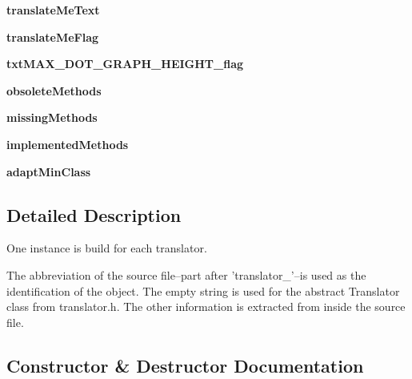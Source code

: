 \begin{DoxyCompactItemize}
{\bfseries translate\+Me\+Text}
\item 
\mbox{\label{classtranslator_1_1_transl_a35ef06fb423fad142c3b1cabbff55380}} 
{\bfseries translate\+Me\+Flag}
\item 
\mbox{\label{classtranslator_1_1_transl_a896359e684a202535f3e97911140eac6}} 
{\bfseries txt\+M\+A\+X\+\_\+\+D\+O\+T\+\_\+\+G\+R\+A\+P\+H\+\_\+\+H\+E\+I\+G\+H\+T\+\_\+flag}
\item 
\mbox{\label{classtranslator_1_1_transl_a106f9e989b0ac4620917606ebfab9471}} 
{\bfseries obsolete\+Methods}
\item 
\mbox{\label{classtranslator_1_1_transl_a4372f5945c9f587fc4476309b9323f31}} 
{\bfseries missing\+Methods}
\item 
\mbox{\label{classtranslator_1_1_transl_a53700a27a1087271ec937483ca546b17}} 
{\bfseries implemented\+Methods}
\item 
\mbox{\label{classtranslator_1_1_transl_a1719592217189c0d7f60cd96592092ae}} 
{\bfseries adapt\+Min\+Class}
\end{DoxyCompactItemize}


\subsection{Detailed Description}
\begin{DoxyVerb}One instance is build for each translator.

The abbreviation of the source file--part after 'translator_'--is used as
the identification of the object. The empty string is used for the
abstract Translator class from translator.h. The other information is
extracted from inside the source file.\end{DoxyVerb}
 

\subsection{Constructor \& Destructor Documentation}
\mbox{\label{classtranslator_1_1_transl_a8c6390ddf78fb1f4e22fb46f6c585fe5}} 
